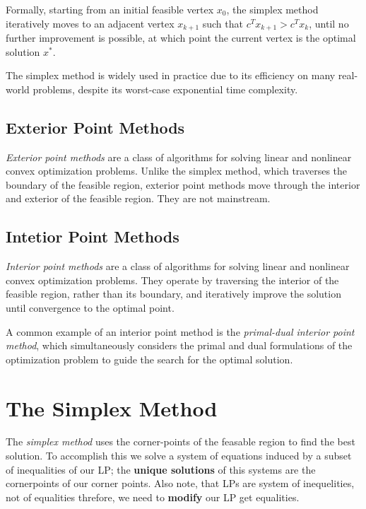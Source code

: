 Formally, starting from an initial feasible vertex \(x_0\), the simplex method iteratively moves to an adjacent vertex
\(x_{k+1}\) such that \(c^T x_{k+1} > c^T x_k\), until no further improvement is possible, at which point the current vertex is the optimal solution
\(x^*\).

The simplex method is widely used in practice due to its efficiency on many real-world problems, despite its worst-case
exponential time complexity.

\subsection{Exterior Point Methods}

\emph{Exterior point methods} are a class of algorithms for solving linear and nonlinear convex optimization problems. Unlike the simplex method, which traverses
the boundary of the feasible region, exterior point methods move through the interior and exterior of the feasible region. They are not mainstream.

\subsection{Intetior Point Methods}

\emph{Interior point methods} are a class of algorithms for solving linear and nonlinear convex optimization problems. They operate by traversing the interior of the feasible region,
rather than its boundary, and iteratively improve the solution until convergence to the optimal point.

A common example of an interior point method is the \emph{primal-dual interior point method}, which simultaneously considers the primal and dual formulations of the
optimization problem to guide the search for the optimal solution.

\section{The Simplex Method}

The \emph{simplex method} uses the corner-points of the feasable region to find the best solution. To accomplish this we solve a system of equations induced by a subset
of inequalities of our LP; the \textbf{unique solutions} of this systems are the cornerpoints of our corner points. Also note, that
LPs are system of inequelities, not of equalities threfore, we need to \textbf{modify} our LP get equalities.

